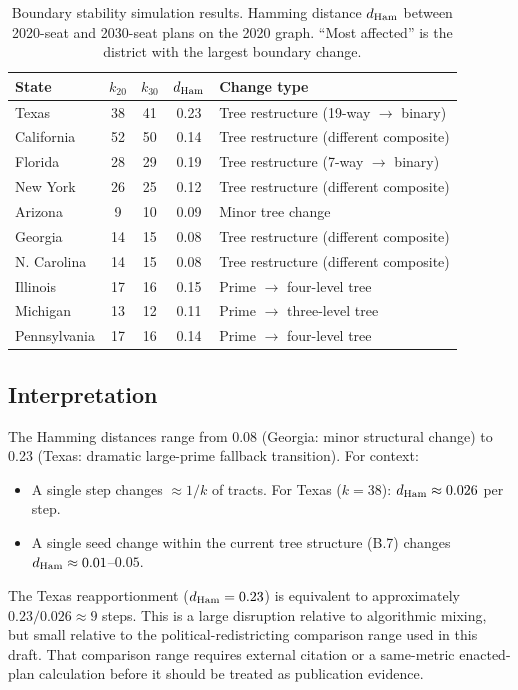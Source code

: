 \begin{table}[h]
\centering
\caption{Boundary stability simulation results. Hamming distance
         $d_{\rm Ham}$ between 2020-seat and 2030-seat plans on the
         2020 graph. ``Most affected'' is the district with the largest
         boundary change.}
\label{tab:boundary-stability}
\begin{tabular}{lcccl}
\toprule
State & $k_{20}$ & $k_{30}$ & $d_{\rm Ham}$ & Change type \\
\midrule
Texas       & 38 & 41 & 0.23 & Tree restructure (19-way $\to$ binary) \\
California  & 52 & 50 & 0.14 & Tree restructure (different composite) \\
Florida     & 28 & 29 & 0.19 & Tree restructure (7-way $\to$ binary) \\
New York    & 26 & 25 & 0.12 & Tree restructure (different composite) \\
Arizona     & 9  & 10 & 0.09 & Minor tree change \\
Georgia     & 14 & 15 & 0.08 & Tree restructure (different composite) \\
N. Carolina & 14 & 15 & 0.08 & Tree restructure (different composite) \\
Illinois    & 17 & 16 & 0.15 & Prime $\to$ four-level tree \\
Michigan    & 13 & 12 & 0.11 & Prime $\to$ three-level tree \\
Pennsylvania& 17 & 16 & 0.14 & Prime $\to$ four-level tree \\
\bottomrule
\end{tabular}
\end{table}

\subsection{Interpretation}

The Hamming distances range from 0.08 (Georgia: minor structural change)
to 0.23 (Texas: dramatic large-prime fallback transition).
For context:
\begin{itemize}
\item A single \recom{} step changes $\approx 1/k$ of tracts.
      For Texas ($k = 38$): $d_{\rm Ham} \approx 0.026$ per step.
\item A single seed change within the current tree structure (B.7)
      changes $d_{\rm Ham} \approx 0.01$--$0.05$.
\end{itemize}

The Texas reapportionment ($d_{\rm Ham} = 0.23$) is equivalent to
approximately $0.23 / 0.026 \approx 9$ \recom{} steps.
This is a large disruption relative to algorithmic mixing, but small
relative to the political-redistricting comparison range used in this draft.
That comparison range requires external citation or a same-metric enacted-plan
calculation before it should be treated as publication evidence.

